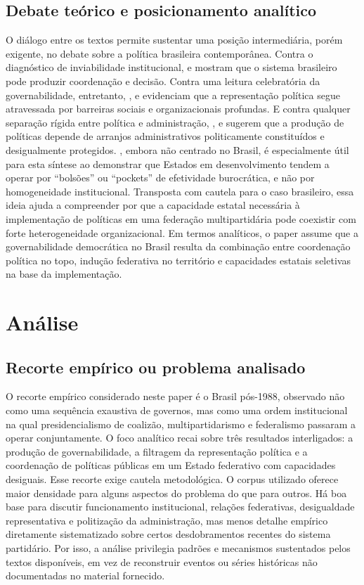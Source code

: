 \documentclass[12pt,a4paper]{article}
\begin{document}
\subsection{Debate teórico e posicionamento analítico}
\label{sec:org0f7408a}
O diálogo entre os textos permite sustentar uma posição intermediária, porém exigente, no debate sobre a política brasileira contemporânea. Contra o diagnóstico de inviabilidade institucional, \textcite{limongi2017_a_crise} e \textcite{palermo2000_como_se} mostram que o sistema brasileiro pode produzir coordenação e decisão. Contra uma leitura celebratória da governabilidade, entretanto, \textcite{campos2017_o_que}, \textcite{gatto2025_resistance_to} e \textcite{sacchet2018_why_gender} evidenciam que a representação política segue atravessada por barreiras sociais e organizacionais profundas. E contra qualquer separação rígida entre política e administração, \textcite{mcdonnell2020_patchwork_leviathan}, \textcite{panizza2022_the_politics} e \textcite{guy2022_bringing_political} sugerem que a produção de políticas depende de arranjos administrativos politicamente constituídos e desigualmente protegidos.
\textcite{mcdonnell2020_patchwork_leviathan}, embora não centrado no Brasil, é especialmente útil para esta síntese ao demonstrar que Estados em desenvolvimento tendem a operar por “bolsões” ou “pockets” de efetividade burocrática, e não por homogeneidade institucional. Transposta com cautela para o caso brasileiro, essa ideia ajuda a compreender por que a capacidade estatal necessária à implementação de políticas em uma federação multipartidária pode coexistir com forte heterogeneidade organizacional. Em termos analíticos, o paper assume que a governabilidade democrática no Brasil resulta da combinação entre coordenação política no topo, indução federativa no território e capacidades estatais seletivas na base da implementação.
\section{Análise}
\label{sec:org8c6b980}
\subsection{Recorte empírico ou problema analisado}
\label{sec:org557e2e2}
O recorte empírico considerado neste paper é o Brasil pós-1988, observado não como uma sequência exaustiva de governos, mas como uma ordem institucional na qual presidencialismo de coalizão, multipartidarismo e federalismo passaram a operar conjuntamente. O foco analítico recai sobre três resultados interligados: a produção de governabilidade, a filtragem da representação política e a coordenação de políticas públicas em um Estado federativo com capacidades desiguais.
Esse recorte exige cautela metodológica. O corpus utilizado oferece maior densidade para alguns aspectos do problema do que para outros. Há boa base para discutir funcionamento institucional, relações federativas, desigualdade representativa e politização da administração, mas menos detalhe empírico diretamente sistematizado sobre certos desdobramentos recentes do sistema partidário. Por isso, a análise privilegia padrões e mecanismos sustentados pelos textos disponíveis, em vez de reconstruir eventos ou séries históricas não documentadas no material fornecido.
\end{document}
